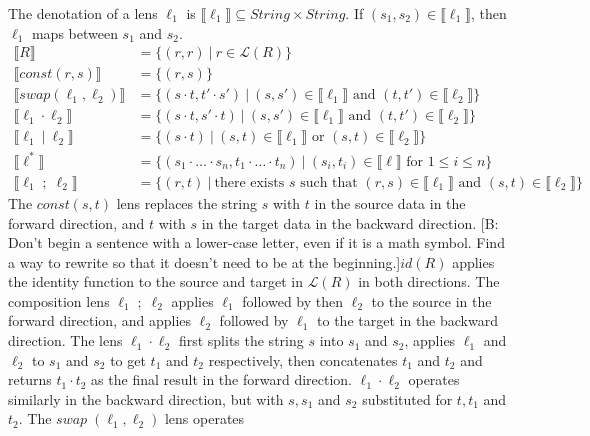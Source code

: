 \documentclass[acmsmall,review,anonymous]{acmart}
\newcommand{\FINISH}[3]{\ifdraft\textcolor{#1}{[#2: #3]}\fi}
\newcommand{\bcp}[1]{\FINISH{dkred}{B}{#1}}
\newcommand{\kw}[1]{\ensuremath{\mathit{#1}}}
\newcommand{\sep}{\ensuremath{\ | \ }}
\newcommand{\const}{\ensuremath{\kw{const}}}
\newcommand{\swap}{\ensuremath{\kw{swap}}}
\begin{document}
The denotation of a lens $\ell_1$ is $\llbracket \ell_1 \rrbracket \subseteq
\mathit{String} \times \mathit{String}$. If $(s_1, s_2) \in \llbracket \ell_1
\rrbracket$, then $\ell_1$ maps between $s_1$ and $s_2$.
\begin{align*}
\llbracket R \rrbracket &= \{(r, r) \sep r \in \mathcal{L}(R)\}\\
\llbracket \const(r, s) \rrbracket &= \{(r, s)\}\\
\llbracket \swap(\ell_1, \ell_2) \rrbracket &= \{(s \cdot t, t' \cdot s') \sep
(s, s') \in \llbracket \ell_1 \rrbracket \text{ and } (t, t') \in \llbracket
\ell_2 \rrbracket\}\\
\llbracket \ell_1 \cdot \ell_2 \rrbracket &= \{(s \cdot t, s' \cdot t) \sep
(s, s') \in \llbracket \ell_1 \rrbracket \text{ and } (t, t') \in \llbracket
\ell_2 \rrbracket\}\\
\llbracket \ell_1 \sep \ell_2 \rrbracket &= \{(s \cdot t) \sep
(s, t) \in \llbracket \ell_1 \rrbracket \text{ or } (s, t) \in \llbracket
\ell_2 \rrbracket\}\\
\llbracket \ell^* \rrbracket &= \{(s_1 \cdot \ldots \cdot s_n, t_1 \cdot \ldots
\cdot t_n) \sep (s_i, t_i) \in \llbracket \ell \rrbracket \text{ for } 1
\leq i \leq n\}\\
\llbracket \ell_1 \; ; \; \ell_2 \rrbracket &= \{(r, t) \sep \text{there exists }s
\text{ such that } (r, s) \in \llbracket \ell_1 \rrbracket \text{ and } (s, t)
\in \llbracket \ell_2 \rrbracket\}
\end{align*}
The $\mathit{\const}(s, t)$ lens replaces the string $s$ with $t$ in the source
data in the forward direction, and $t$ with $s$ in the target data in the backward
direction. \bcp{Don't begin a sentence with a lower-case letter, even if it
  is a math symbol.  Find a way to rewrite so that it doesn't need to be at
  the beginning.}$\mathit{id}(R)$ applies the identity function to the
source and target 
in $\mathcal{L}(R)$ in both directions. The composition lens $\ell_1 \; ; \; \ell_2$
applies $\ell_1$ followed by then $\ell_2$ to the source in the forward direction,
and applies $\ell_2$ followed by $\ell_1$ to the target in the backward direction.
The lens $\ell_1 \cdot \ell_2$ first splits the string $s$ into $s_1$ and $s_2$,
applies $\ell_1$ and $\ell_2$ to $s_1$ and $s_2$ to get $t_1$ and $t_2$
respectively, then concatenates $t_1$ and $t_2$ and returns $t_1 \cdot t_2$ as
the final result in the forward direction. $\ell_1 \cdot \ell_2$ operates
similarly in the backward direction, but with $s, s_1$ and $s_2$ substituted
for $t, t_1$ and $t_2$. The $\mathit{\swap} \; (\ell_1, \ell_2)$ lens operates
\end{document}
